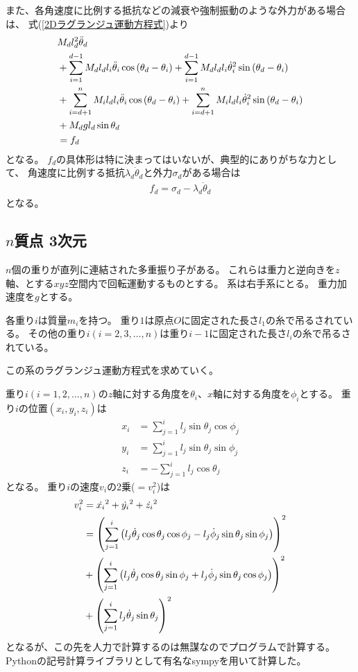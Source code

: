 \documentclass{jsarticle}
\newcommand{\eqa}[1]{\begin{align}#1\end{align}}
\newcommand{\refeq}[1]{式(\ref{#1})}
\newcommand{\cost}[2]{\cos\left(\theta_{#1}-\theta_{#2}\right)}
\newcommand{\sint}[2]{\sin\left(\theta_{#1}-\theta_{#2}\right)}
\newcommand{\dott}[1]{\dot{\theta}_{#1}}
\newcommand{\dotp}[1]{\dot{\phi}_{#1}}
\newcommand{\ddott}[1]{\ddot{\theta}_{#1}}
\begin{document}
また、各角速度に比例する抵抗などの減衰や強制振動のような外力がある場合は、
\refeq{2Dラグランジュ運動方程式}より
\eqa{
	&M_d l_d^2 \ddott{d} \notag\\
		&+ \sum_{i=1}^{d-1} M_d l_d l_i \ddott{i} \cost{d}{i}
			+ \sum_{i=1}^{d-1} M_d l_d l_i \dott{i}^2 \sint{d}{i} \notag\\
		&+ \sum_{i=d+1}^n M_i l_d l_i \ddott{i} \cost{d}{i}
			+ \sum_{i=d+1}^n M_i l_d l_i \dott{i}^2 \sint{d}{i} \notag\\
		&+ M_d g l_d \sin\theta_d \notag\\
	&= f_d
}
となる。
$f_d$の具体形は特に決まってはいないが、典型的にありがちな力として、
角速度に比例する抵抗$\lambda_d \dott{d}$と外力$\sigma_d$がある場合は
\eqa{
	f_d = \sigma_d - \lambda_d \dott{d}
}
となる。


\subsection{$n$質点 3次元}

$n$個の重りが直列に連結された多重振り子がある。
これらは重力と逆向きを$z$軸、とする$xyz$空間内で回転運動するものとする。
系は右手系にとる。
重力加速度を$g$とする。

各重り$i$は質量$m_i$を持つ。
重り$1$は原点$O$に固定された長さ$l_1$の糸で吊るされている。
その他の重り$i(i=2,3,\dots,n)$は重り$i-1$に固定された長さ$l_i$の糸で吊るされている。

この系のラグランジュ運動方程式を求めていく。

重り$i(i=1,2,\dots,n)$の$z$軸に対する角度を$\theta_i$、$x$軸に対する角度を$\phi_i$とする。
重り$i$の位置$(x_i, y_i, z_i)$は
\eqa{
	x_i &= \sum_{j=1}^i l_j \sin\theta_j \cos\phi_j \\
	y_i &= \sum_{j=1}^i l_j \sin\theta_j \sin\phi_j \\
	z_i &= -\sum_{j=1}^i l_j \cos\theta_j
}
となる。
重り$i$の速度$v_i$の2乗($=v_i^2$)は
\eqa{
	v_i^2 &= \dot{x_i}^2 + \dot{y_i}^2 + \dot{z_i}^2 \notag\\
		&= \left(\sum_{j=1}^i \left( l_j \dott{j} \cos\theta_j \cos\phi_j - l_j \dotp{j} \sin\theta_j \sin\phi_j \right) \right)^2 \notag\\
		&+ \left(\sum_{j=1}^i \left( l_j \dott{j} \cos\theta_j \sin\phi_j + l_j \dotp{j} \sin\theta_j \cos\phi_j \right) \right)^2 \notag\\
		&+ \left(\sum_{j=1}^i l_j \dott{j} \sin\theta_j \right)^2 \notag
}
となるが、この先を人力で計算するのは無謀なのでプログラムで計算する。
Pythonの記号計算ライブラリとして有名なsympyを用いて計算した。
\end{document}
